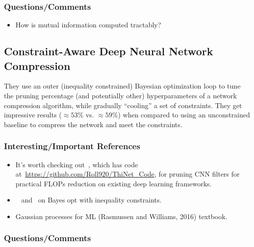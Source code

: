 \documentclass[a4paper, 12pt]{article}
\begin{document}
\subsubsection{Questions/Comments}

\begin{itemize}
        \item How is mutual information computed tractably?
\end{itemize}


\subsection{Constraint-Aware Deep Neural Network
            Compression~\cite{chen2018constraint}}

They use an outer (inequality constrained) Bayesian optimization loop to tune
the pruning percentage (and potentially other) hyperparameters of a network
compression algorithm, while gradually ``cooling'' a set of constraints. They
get impressive results ($\approx 53\%$ vs. $\approx 59\%$) when compared to
using an unconstrained baseline to compress the network and meet the
constraints.


\subsubsection{Interesting/Important References}

\begin{itemize}
        \item It's worth checking out~\cite{luo2018thinet}, which has code
                at~\url{https://github.com/Roll920/ThiNet_Code}, for pruning
                CNN filters for practical FLOPs reduction on existing deep
                learning frameworks.

        \item~\cite{gelbart2014bayesian} and~\cite{gardner2014bayesian} on
                Bayes opt with inequality constraints.

        \item Gaussian processes for ML (Rasmussen and Williams, 2016)
                textbook.
\end{itemize}


\subsubsection{Questions/Comments}
\end{document}
